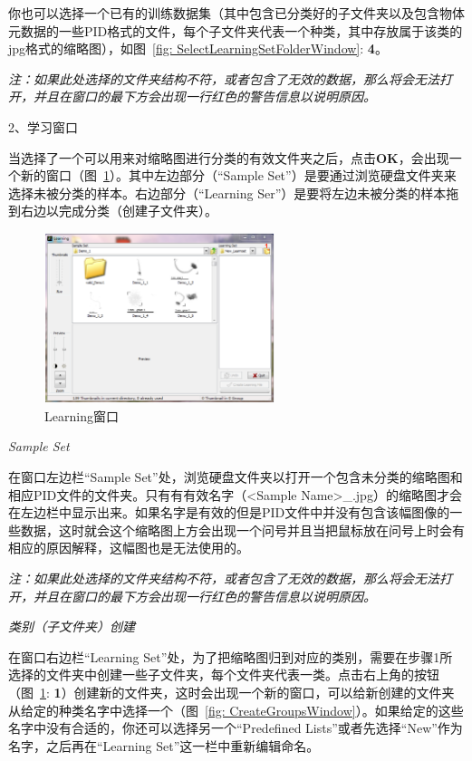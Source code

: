 \documentclass[12pt]{article}
\begin{document}
你也可以选择一个已有的训练数据集（其中包含已分类好的子文件夹以及包含物体元数据的一些PID格式的文件，每个子文件夹代表一个种类，其中存放属于该类的jpg格式的缩略图），如图~\ref{fig: SelectLearningSetFolderWindow}: {\color{red}\textbf{4}}。

{\color{blue}\textit{注：如果此处选择的文件夹结构不符，或者包含了无效的数据，那么将会无法打开，并且在窗口的最下方会出现一行红色的警告信息以说明原因。}}

2、学习窗口

当选择了一个可以用来对缩略图进行分类的有效文件夹之后，点击\textbf{OK}，会出现一个新的窗口（图~\ref{fig: LearningWindow}）。其中左边部分（“Sample Set”）是要通过浏览硬盘文件夹来选择未被分类的样本。右边部分（“Learning Ser”）是要将左边未被分类的样本拖到右边以完成分类（创建子文件夹）。

\begin{figure}[!ht]
\centering
\includegraphics[width=0.6\textwidth]{LearningWindow.eps}
\caption{Learning窗口}
\label{fig: LearningWindow}
\end{figure} 

\textit{Sample Set}

在窗口左边栏“Sample Set”处，浏览硬盘文件夹以打开一个包含未分类的缩略图和相应PID文件的文件夹。只有有有效名字（<Sample Name>\_<Item Number>.jpg）的缩略图才会在左边栏中显示出来。如果名字是有效的但是PID文件中并没有包含该幅图像的一些数据，这时就会这个缩略图上方会出现一个问号并且当把鼠标放在问号上时会有相应的原因解释，这幅图也是无法使用的。

\textit{注：如果此处选择的文件夹结构不符，或者包含了无效的数据，那么将会无法打开，并且在窗口的最下方会出现一行红色的警告信息以说明原因。}

\textit{类别（子文件夹）创建}

在窗口右边栏“Learning Set”处，为了把缩略图归到对应的类别，需要在步骤1所选择的文件夹中创建一些子文件夹，每个文件夹代表一类。点击右上角的按钮（图~\ref{fig: LearningWindow}: {\color{red}\textbf{1}}）创建新的文件夹，这时会出现一个新的窗口，可以给新创建的文件夹从给定的种类名字中选择一个（图~\ref{fig: CreateGroupsWindow}）。如果给定的这些名字中没有合适的，你还可以选择另一个“Predefined Lists”或者先选择“New”作为名字，之后再在“Learning Set”这一栏中重新编辑命名。
\end{document}
